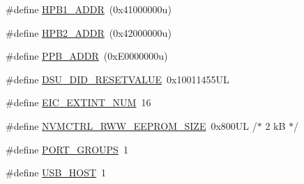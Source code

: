 \begin{DoxyCompactItemize}
\#define \mbox{\hyperlink{group___s_a_m_d21_e16_b_u__definitions_gabdae009c8fef488e4248183ffa937535}{H\+P\+B1\+\_\+\+A\+D\+DR}}~(0x41000000u)
\item 
\#define \mbox{\hyperlink{group___s_a_m_d21_e16_b_u__definitions_gaef42fa53ddf169a2a50be70d29f73571}{H\+P\+B2\+\_\+\+A\+D\+DR}}~(0x42000000u)
\item 
\#define \mbox{\hyperlink{group___s_a_m_d21_e16_b_u__definitions_ga8895d0a3a9a3126cc44330f86c8ce564}{P\+P\+B\+\_\+\+A\+D\+DR}}~(0x\+E0000000u)
\item 
\#define \mbox{\hyperlink{group___s_a_m_d21_e16_b_u__definitions_gada75131d542c9e1966238f5488f89bd6}{D\+S\+U\+\_\+\+D\+I\+D\+\_\+\+R\+E\+S\+E\+T\+V\+A\+L\+UE}}~0x10011455\+UL
\item 
\#define \mbox{\hyperlink{group___s_a_m_d21_e16_b_u__definitions_ga88ebc38c95506296f5d21f82476296ae}{E\+I\+C\+\_\+\+E\+X\+T\+I\+N\+T\+\_\+\+N\+UM}}~16
\item 
\#define \mbox{\hyperlink{group___s_a_m_d21_e16_b_u__definitions_gacb7a115808eeb0b50bd55888f9ba65ae}{N\+V\+M\+C\+T\+R\+L\+\_\+\+R\+W\+W\+\_\+\+E\+E\+P\+R\+O\+M\+\_\+\+S\+I\+ZE}}~0x800\+U\+L /$\ast$ 2 k\+B $\ast$/
\item 
\#define \mbox{\hyperlink{group___s_a_m_d21_e16_b_u__definitions_gab9243ffe03a1dc631b57a495b4b3d467}{P\+O\+R\+T\+\_\+\+G\+R\+O\+U\+PS}}~1
\item 
\#define \mbox{\hyperlink{group___s_a_m_d21_e16_b_u__definitions_ga856aa08fb33114928cbc8635be1792e4}{U\+S\+B\+\_\+\+H\+O\+ST}}~1
\end{DoxyCompactItemize}

